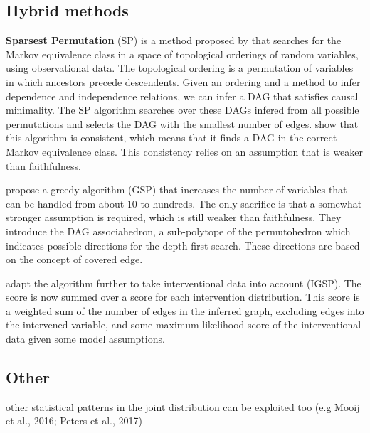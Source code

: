 \subsection*{Hybrid methods}

\textbf{Sparsest Permutation} (SP) is a method proposed by \citet{raskutti2018learning} that searches for the Markov equivalence class in a space of topological orderings of random variables, using observational data. The topological ordering is a permutation of variables in which ancestors precede descendents. Given an ordering and a method to infer dependence and independence relations, we can infer a DAG that satisfies causal minimality. The SP algorithm searches over these DAGs infered from all possible permutations and selects the DAG with the smallest number of edges. \citet{raskutti2018learning} show that this algorithm is consistent, which means that it finds a DAG in the correct Markov equivalence class. This consistency relies on an assumption that is weaker than faithfulness. 

\citet{solus2017consistency} propose a greedy algorithm (GSP) that increases the number of variables that can be handled from about 10 to hundreds. The only sacrifice is that a somewhat stronger assumption is required, which is still weaker than faithfulness. They introduce the DAG associahedron, a sub-polytope of the permutohedron which indicates possible directions for the depth-first search. These directions are based on the concept of covered edge. 

\citet{wang2017permutation} adapt the algorithm further to take interventional data into account (IGSP). The score is now summed over a score for each intervention distribution. This score is a weighted sum of the number of edges in the inferred graph, excluding edges into the intervened variable, and some maximum likelihood score of the interventional data given some model assumptions.





\subsection*{Other}
other statistical patterns in the joint distribution can be exploited too (e.g Mooij et al., 2016; Peters et al., 2017)


